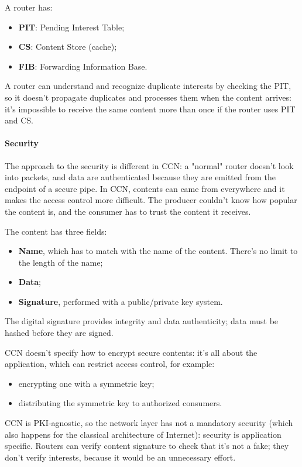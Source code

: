 A router has:
\begin{itemize}
  \item \textbf{PIT}: Pending Interest Table;
  \item \textbf{CS}: Content Store (cache);
  \item \textbf{FIB}: Forwarding Information Base.
\end{itemize}

A router can understand and recognize duplicate interests by checking the PIT,
so it doesn't propagate duplicates and processes them when the content arrives:
it's impossible to receive the same content more than once if the router uses
PIT and CS.

\paragraph*{Security}
The approach to the security is different in CCN: a "normal" router doesn't
look into packets, and data are authenticated because they are emitted from
the endpoint of a secure pipe. In CCN, contents can came from everywhere and it
makes the access control more difficult. The producer couldn't know how popular
the content is, and the consumer has to trust the content it receives.

The content has three fields:
\begin{itemize}
  \item \textbf{Name}, which has to match with the name of the content. There's
no limit to the length of the name;
  \item \textbf{Data};
  \item \textbf{Signature}, performed with a public/private key system.
\end{itemize}
The digital signature provides integrity and data authenticity; data must be
hashed before they are signed.

CCN doesn't specify how to encrypt secure contents: it's all about the
application, which can restrict access control, for example:
\begin{itemize}
  \item encrypting one with a symmetric key;
  \item distributing the symmetric key to authorized consumers.
\end{itemize}
CCN is PKI-agnostic, so the network layer has not a mandatory security (which
also happens for the classical architecture of Internet): security is
application specific. Routers can verify content signature to check that
it's not a fake; they don't verify interests, because it would be an
unnecessary effort.

